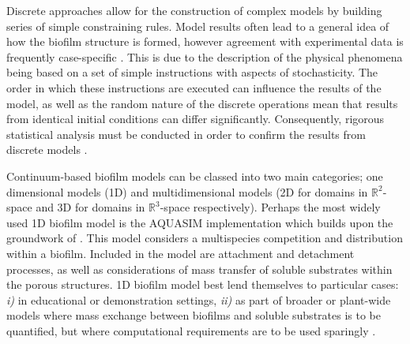 \skippingparagraph
Discrete approaches allow for the construction of complex models by building series of simple constraining rules. Model results often lead to a general idea of how the biofilm structure is formed, however agreement with experimental data is frequently case-specific \cite{Mattei2015}. This is due to the description of the physical phenomena being based on a set of simple instructions with aspects of stochasticity. The order in which these instructions are executed can influence the results of the model, as well as the random nature of the discrete operations mean that results from identical initial conditions can differ significantly. Consequently, rigorous statistical analysis must be conducted in order to confirm the results from discrete models \cite{alpkvist2006}.

Continuum-based biofilm models can be classed into two main categories; one dimensional models (1D) and multidimensional models (2D for domains in $\mathbb{R}^2$-space and 3D for domains in $\mathbb{R}^3$-space respectively). Perhaps the most widely used 1D biofilm model is the AQUASIM implementation \cite{reichert1994} which builds upon the groundwork of \cite{wanner1986} \cite{wanner1986}. This model considers a multispecies competition and distribution within a biofilm. Included in the model are attachment and detachment processes, as well as considerations of mass transfer of soluble substrates within the porous structures. 1D biofilm model best lend themselves to particular cases: \textit{i)} in educational or demonstration settings, \textit{ii)} as part of broader or plant-wide models where mass exchange between biofilms and soluble substrates is to be quantified, but where computational requirements are to be used sparingly \cite{Mattei2015}.
\skippingparagraph
